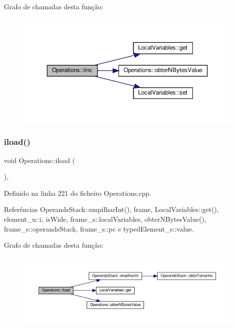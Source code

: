 Grafo de chamadas desta função\+:
\nopagebreak
\begin{figure}[H]
\begin{center}
\leavevmode
\includegraphics[width=350pt]{classOperations_a9934f9369192b10a978c7d6950592c42_cgraph}
\end{center}
\end{figure}
\mbox{\label{classOperations_a84e70afc25fa4e54a7e2bffae742222a}} 
\subsubsection{\texorpdfstring{iload()}{iload()}}
{\footnotesize\ttfamily void Operations\+::iload (\begin{DoxyParamCaption}{ }\end{DoxyParamCaption})\hspace{0.3cm}{\ttfamily [static]}, {\ttfamily [private]}}



Definido na linha 221 do ficheiro Operations.\+cpp.



Referências Operands\+Stack\+::empilhar\+Int(), frame, Local\+Variables\+::get(), element\+\_\+u\+::i, is\+Wide, frame\+\_\+s\+::local\+Variables, obter\+N\+Bytes\+Value(), frame\+\_\+s\+::operands\+Stack, frame\+\_\+s\+::pc e typed\+Element\+\_\+s\+::value.

Grafo de chamadas desta função\+:
\nopagebreak
\begin{figure}[H]
\begin{center}
\leavevmode
\includegraphics[width=350pt]{classOperations_a84e70afc25fa4e54a7e2bffae742222a_cgraph}
\end{center}
\end{figure}
\mbox{\label{classOperations_a3aba059cf78681767c141d27989fc2aa}} 
